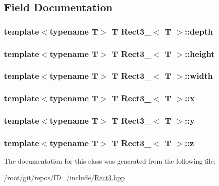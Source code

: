 \subsection{\-Field \-Documentation}
\hypertarget{classRect3___a73850e016f7e8152e47d430239c47cc2}{
\subsubsection[{depth}]{\setlength{\rightskip}{0pt plus 5cm}template$<$typename \-T$>$ \-T {\bf \-Rect3\-\_\-}$<$ \-T $>$\-::{\bf depth}}}\label{classRect3___a73850e016f7e8152e47d430239c47cc2}
\hypertarget{classRect3___a4f10fdcf15fe8cdb6b01a9b90d56ebe5}{
\subsubsection[{height}]{\setlength{\rightskip}{0pt plus 5cm}template$<$typename \-T$>$ \-T {\bf \-Rect3\-\_\-}$<$ \-T $>$\-::{\bf height}}}\label{classRect3___a4f10fdcf15fe8cdb6b01a9b90d56ebe5}
\hypertarget{classRect3___a780cbb24a81d6bbfff26c2ac6660beb8}{
\subsubsection[{width}]{\setlength{\rightskip}{0pt plus 5cm}template$<$typename \-T$>$ \-T {\bf \-Rect3\-\_\-}$<$ \-T $>$\-::{\bf width}}}\label{classRect3___a780cbb24a81d6bbfff26c2ac6660beb8}
\hypertarget{classRect3___a035f211c0c365a9dbd15436cb5448e31}{
\subsubsection[{x}]{\setlength{\rightskip}{0pt plus 5cm}template$<$typename \-T$>$ \-T {\bf \-Rect3\-\_\-}$<$ \-T $>$\-::{\bf x}}}\label{classRect3___a035f211c0c365a9dbd15436cb5448e31}
\hypertarget{classRect3___ab2c61e4e318bc064eb8bb707b699cbb6}{
\subsubsection[{y}]{\setlength{\rightskip}{0pt plus 5cm}template$<$typename \-T$>$ \-T {\bf \-Rect3\-\_\-}$<$ \-T $>$\-::{\bf y}}}\label{classRect3___ab2c61e4e318bc064eb8bb707b699cbb6}
\hypertarget{classRect3___a99bae7d4f2bf0af6a3ffbfb0fa752b9e}{
\subsubsection[{z}]{\setlength{\rightskip}{0pt plus 5cm}template$<$typename \-T$>$ \-T {\bf \-Rect3\-\_\-}$<$ \-T $>$\-::{\bf z}}}\label{classRect3___a99bae7d4f2bf0af6a3ffbfb0fa752b9e}


\-The documentation for this class was generated from the following file\-:\begin{DoxyCompactItemize}
\item 
/root/git/repos/\-I\-D\-\_/include/\hyperlink{Rect3_8hpp}{\-Rect3.\-hpp}\end{DoxyCompactItemize}
